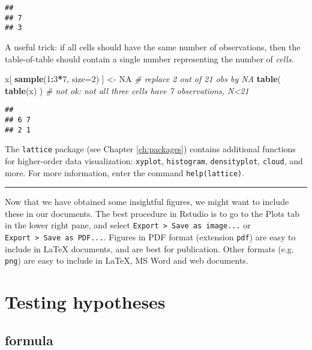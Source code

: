 \documentclass[]{book}
\newenvironment{Shaded}{\begin{snugshade}}{\end{snugshade}}
\newcommand{\CommentTok}[1]{\textcolor[rgb]{0.56,0.35,0.01}{\textit{#1}}}
\newcommand{\DataTypeTok}[1]{\textcolor[rgb]{0.13,0.29,0.53}{#1}}
\newcommand{\DecValTok}[1]{\textcolor[rgb]{0.00,0.00,0.81}{#1}}
\newcommand{\KeywordTok}[1]{\textcolor[rgb]{0.13,0.29,0.53}{\textbf{#1}}}
\newcommand{\NormalTok}[1]{#1}
\newcommand{\OperatorTok}[1]{\textcolor[rgb]{0.81,0.36,0.00}{\textbf{#1}}}
\newcommand{\OtherTok}[1]{\textcolor[rgb]{0.56,0.35,0.01}{#1}}
\newcommand{\StringTok}[1]{\textcolor[rgb]{0.31,0.60,0.02}{#1}}
\begin{document}
\begin{verbatim}
## 
## 7 
## 3
\end{verbatim}

A useful trick: if all cells should have the
same number of observations, then the table-of-table should contain
a single number representing the number of \emph{cells}.

\begin{Shaded}
\begin{Highlighting}[]
\NormalTok{x[ }\KeywordTok{sample}\NormalTok{(}\DecValTok{1}\OperatorTok{:}\DecValTok{3}\OperatorTok{*}\DecValTok{7}\NormalTok{, }\DataTypeTok{size=}\DecValTok{2}\NormalTok{) ] <-}\StringTok{ }\OtherTok{NA} \CommentTok{# replace 2 out of 21 obs by NA}
\KeywordTok{table}\NormalTok{( }\KeywordTok{table}\NormalTok{(x) ) }\CommentTok{# not ok: not all three cells have 7 observations, N<21}
\end{Highlighting}
\end{Shaded}

\begin{verbatim}
## 
## 6 7 
## 2 1
\end{verbatim}

The \texttt{lattice} package (see Chapter \ref{ch:packages}) contains additional functions for higher-order data visualization:
\texttt{xyplot},
\texttt{histogram},
\texttt{densityplot},
\texttt{cloud},
and more. For more information, enter the command
\texttt{help(lattice)}.

\begin{center}\rule{0.5\linewidth}{0.5pt}\end{center}

Now that we have obtained some insightful figures, we might want to
include these in our documents. The best procedure in Rstudio is to go to the Plots tab in the lower right pane, and select \texttt{Export\ \textgreater{}\ Save\ as\ image...} or \texttt{Export\ \textgreater{}\ Save\ as\ PDF...}. Figures in PDF format (extension
\texttt{pdf}) are easy to include in LaTeX documents, and are best for
publication. Other formats (e.g. \texttt{png}) are easy to include
in LaTeX, MS Word and web documents.

\hypertarget{ch:testinghypotheses}{%
\chapter{Testing hypotheses}\label{ch:testinghypotheses}}

\hypertarget{formula}{%
\section{formula}\label{formula}}
\end{document}
